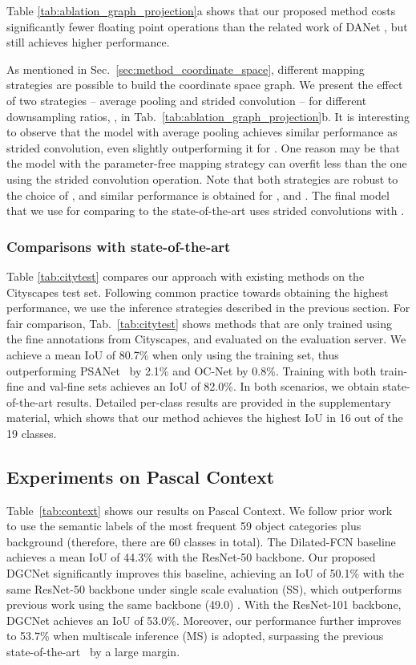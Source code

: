 \documentclass{bmvc2k}
\begin{document}
Table \ref{tab:ablation_graph_projection}a shows that our proposed method costs significantly fewer floating point operations than the related work of DANet \cite{DAnet}, but still achieves higher performance.

As mentioned in Sec.~\ref{sec:method_coordinate_space}, different mapping strategies are possible to build the coordinate space graph.
We present the effect of two strategies -- average pooling and strided convolution -- for different downsampling ratios, , in Tab.~\ref{tab:ablation_graph_projection}b.
It is interesting to observe that the model with average pooling achieves similar performance as strided convolution, even slightly outperforming it for .
One reason may be that the model with the parameter-free mapping strategy can overfit less than the one using the strided convolution operation.
Note that both strategies are robust to the choice of , and similar performance is obtained for ,  and .
The final model that we use for comparing to the state-of-the-art uses strided convolutions with .


\subsubsection{Comparisons with state-of-the-art}
Table \ref{tab:citytest} compares our approach with existing methods on the Cityscapes test set.
Following common practice towards obtaining the highest performance, we use the inference strategies described in the previous section.
For fair comparison, Tab.~\ref{tab:citytest} shows methods that are only trained using the fine annotations from Cityscapes, and evaluated on the evaluation server.
We achieve a mean IoU of 80.7\% when only using the training set, thus outperforming PSANet~\cite{psanet} by 2.1\% and OC-Net \cite{ocnet} by 0.8\%.
Training with both train-fine and val-fine sets achieves an IoU of 82.0\%.
In both scenarios, we obtain state-of-the-art results.
Detailed per-class results are provided in the supplementary material, which shows that our method achieves the highest IoU in 16 out of the 19 classes.


\subsection{Experiments on Pascal Context}
\label{sec:exp_pc}

Table~\ref{tab:context} shows our results on Pascal Context.
We follow prior work~\cite{refinenet,encodingnet,DAnet} to use the semantic labels of the most frequent 59 object categories plus background (therefore, there are 60 classes in total).
The Dilated-FCN baseline achieves a mean IoU of 44.3\% with the ResNet-50 backbone.
Our proposed DGCNet significantly improves this baseline, achieving an IoU of 50.1\% with the same ResNet-50 backbone under single scale evaluation (SS), which outperforms previous work using the same backbone (49.0) \cite{encodingnet}.
With the ResNet-101 backbone, DGCNet achieves an IoU of 53.0\%. 
Moreover, our performance further improves to 53.7\% when multiscale inference (MS) is adopted, surpassing the previous state-of-the-art~\cite{DAnet} by a large margin.
\end{document}
